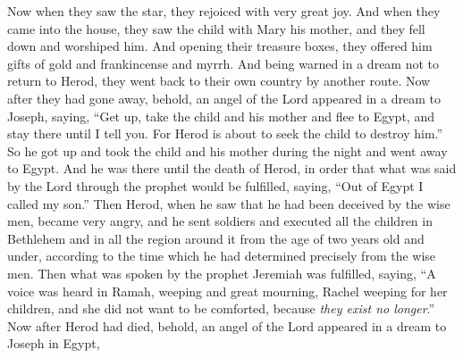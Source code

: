 \begin{biblechapter}
\verse Now when they saw the star, they rejoiced with very great joy.
\verse And when they came into the house, they saw the child with Mary his mother, and they fell down and worshiped him. And opening their treasure boxes, they offered him gifts of gold and frankincense and myrrh.
\verse And being warned in a dream not to return to Herod, they went back to their own country by another route.
 Now after they had gone away, behold, an angel of the Lord appeared in a dream to Joseph, saying, “Get up, take the child and his mother and flee to Egypt, and stay there until I tell you. For Herod is about to seek the child to destroy him.”
\verse So he got up and took the child and his mother during the night and went away to Egypt.
\verse And he was there until the death of Herod, in order that what was said by the Lord through the prophet would be fulfilled, saying, “Out of Egypt I called my son.”
 Then Herod, when he saw that he had been deceived by the wise men, became very angry, and he sent soldiers and executed all the children in Bethlehem and in all the region around it from the age of two years old and under, according to the time which he had determined precisely from the wise men.
\verse Then what was spoken by the prophet Jeremiah was fulfilled, saying,
\verse “A voice was heard in Ramah, 
weeping and great mourning, 
Rachel weeping for her children, 
and she did not want to be comforted, 
because \textit{they exist no longer}.”
 Now after Herod had died, behold, an angel of the Lord appeared in a dream to Joseph in Egypt,

\end{biblechapter}
